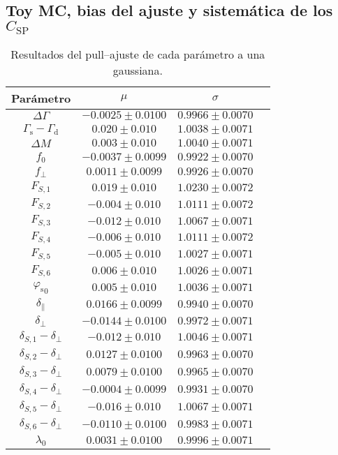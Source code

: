 \begin{subappendices}





\section{Toy MC, bias del ajuste y sistemática de los $C_{\text{SP}}$}





\begin{table}[H]
  \centering
  \begin{tabular}{cccc}
  \toprule
  Parámetro & $\mu$ & $\sigma$ & \\ 
  \midrule
$\Delta \Gamma$ &  $-0.0025 \pm 0.0100$ &  $0.9966 \pm 0.0070$ & \\
$\Gamma_{\mathrm{s}} - \Gamma_{\mathrm{d}}$ &  $0.020 \pm 0.010$ &  $1.0038 \pm 0.0071$ & \\
$\Delta M$ &  $0.003 \pm 0.010$ &  $1.0040 \pm 0.0071$ & \\
$f_{0}$ &  $-0.0037 \pm 0.0099$ &  $0.9922 \pm 0.0070$ & \\
$f_{\perp}$ &  $0.0011 \pm 0.0099$ &  $0.9926 \pm 0.0070$ & \\
$F_{S,1}$ &  $0.019 \pm 0.010$ &  $1.0230 \pm 0.0072$ & \\
$F_{S,2}$ &  $-0.004 \pm 0.010$ &  $1.0111 \pm 0.0072$ & \\
$F_{S,3}$ &  $-0.012 \pm 0.010$ &  $1.0067 \pm 0.0071$ & \\
$F_{S,4}$ &  $-0.006 \pm 0.010$ &  $1.0111 \pm 0.0072$ & \\
$F_{S,5}$ &  $-0.005 \pm 0.010$ &  $1.0027 \pm 0.0071$ & \\
$F_{S,6}$ &  $0.006 \pm 0.010$ &  $1.0026 \pm 0.0071$ & \\
${\varphi_{\mathrm{s}}}_0$ &  $0.005 \pm 0.010$ &  $1.0036 \pm 0.0071$ & \\
$\delta_{\parallel}$ &  $0.0166 \pm 0.0099$ &  $0.9940 \pm 0.0070$ & \\
$\delta_{\perp}$ &  $-0.0144 \pm 0.0100$ &  $0.9972 \pm 0.0071$ & \\
$\delta_{S,1}- \delta_{\perp}$ &  $-0.012 \pm 0.010$ &  $1.0046 \pm 0.0071$ & \\
$\delta_{S,2}- \delta_{\perp}$ &  $0.0127 \pm 0.0100$ &  $0.9963 \pm 0.0070$ & \\
$\delta_{S,3}- \delta_{\perp}$ &  $0.0079 \pm 0.0100$ &  $0.9965 \pm 0.0070$ & \\
$\delta_{S,4}- \delta_{\perp}$ &  $-0.0004 \pm 0.0099$ &  $0.9931 \pm 0.0070$ & \\
$\delta_{S,5}- \delta_{\perp}$ &  $-0.016 \pm 0.010$ &  $1.0067 \pm 0.0071$ & \\
$\delta_{S,6}- \delta_{\perp}$ &  $-0.0110 \pm 0.0100$ &  $0.9983 \pm 0.0071$ & \\
$\lambda_0$ &  $0.0031 \pm 0.0100$ &  $0.9996 \pm 0.0071$ & \\
  \bottomrule  
  \end{tabular}
  \caption{Resultados del pull--ajuste de cada parámetro a una gaussiana.}
\end{table}





\end{subappendices}
